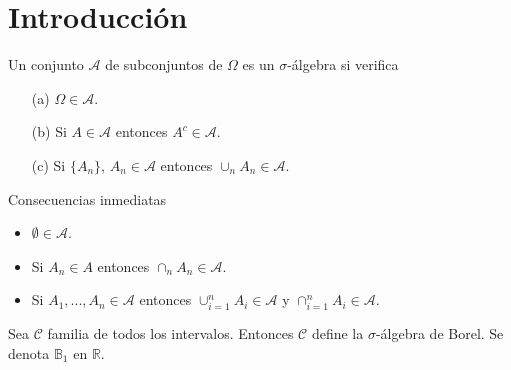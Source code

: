 \chapter{Introducción}

\begin{defi}
Un conjunto $\mathcal{A}$ de subconjuntos de $\Omega$ es un $\sigma$-álgebra si verifica
\begin{enumerate}
    \item[(a)] $\Omega \in \mathcal{A}$.
    \item[(b)] Si $A \in \mathcal{A}$ entonces $A^c \in \mathcal{A}$.
    \item[(c)] Si $\{A_n\}$, $A_n \in \mathcal{A}$ entonces $\cup_{n}{A_n} \in \mathcal{A}$.
\end{enumerate}
Consecuencias inmediatas
\begin{itemize}
    \item $\emptyset \in \mathcal{A}$.
    \item Si $A_n \in A$ entonces $\cap_{n}{A_n} \in \mathcal{A}$.
    \item Si $A_1,...,A_n \in \mathcal{A}$ entonces $\cup_{i=1}^{n}{A_i} \in \mathcal{A}$ y $\cap_{i=1}^{n}{A_i} \in \mathcal{A}$.
\end{itemize}
\end{defi}

\begin{defi}
Sea $\mathscr{C}$ familia de todos los intervalos. Entonces $\mathscr{C}$ define la $\sigma$-álgebra de Borel. Se denota $\mathbb{B}_1$ en $\mathbb{R}$.
\end{defi}

